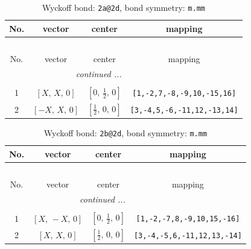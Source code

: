\documentclass[fleqn,8pt]{jsarticle}
\begin{document}
\begin{longtable}{cccc}
\caption{Wyckoff bond: {\tt 2a@2d}, bond symmetry: {\tt m.mm}}
 \\
 \hline \hline
No. & vector & center & mapping \\ \hline \endfirsthead

\multicolumn{3}{l}{\tablename\ \thetable{}} \\
 \hline \hline
No. & vector & center & mapping \\ \hline \endhead

 \hline \hline
\multicolumn{3}{r}{\footnotesize\it continued ...} \\ \endfoot

 \hline \hline
\multicolumn{3}{r}{} \\ \endlastfoot

1 & $\left[ X,\, X,\, 0 \right]$ & $\left[ 0,\, \frac{1}{2},\, 0 \right]$ & {\tt [1,-2,7,-8,-9,10,-15,16]} \\ \hline
2 & $\left[ - X,\, X,\, 0 \right]$ & $\left[ \frac{1}{2},\, 0,\, 0 \right]$ & {\tt [3,-4,5,-6,-11,12,-13,14]} \\
\end{longtable}
\renewcommand{\arraystretch}{1.2}
\begin{longtable}{cccc}
\caption{Wyckoff bond: {\tt 2b@2d}, bond symmetry: {\tt m.mm}}
 \\
 \hline \hline
No. & vector & center & mapping \\ \hline \endfirsthead

\multicolumn{3}{l}{\tablename\ \thetable{}} \\
 \hline \hline
No. & vector & center & mapping \\ \hline \endhead

 \hline \hline
\multicolumn{3}{r}{\footnotesize\it continued ...} \\ \endfoot

 \hline \hline
\multicolumn{3}{r}{} \\ \endlastfoot

1 & $\left[ X,\, - X,\, 0 \right]$ & $\left[ 0,\, \frac{1}{2},\, 0 \right]$ & {\tt [1,-2,-7,8,-9,10,15,-16]} \\ \hline
2 & $\left[ X,\, X,\, 0 \right]$ & $\left[ \frac{1}{2},\, 0,\, 0 \right]$ & {\tt [3,-4,-5,6,-11,12,13,-14]} \\
\end{longtable}
\renewcommand{\arraystretch}{1.2}
\end{document}
